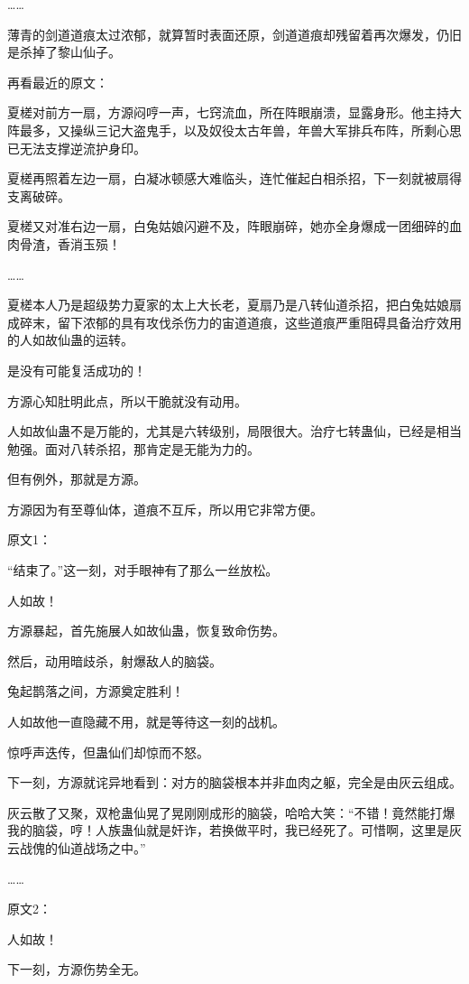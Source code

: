 \begin{this_body}
……

薄青的剑道道痕太过浓郁，就算暂时表面还原，剑道道痕却残留着再次爆发，仍旧是杀掉了黎山仙子。

再看最近的原文：

夏槎对前方一扇，方源闷哼一声，七窍流血，所在阵眼崩溃，显露身形。他主持大阵最多，又操纵三记大盗鬼手，以及奴役太古年兽，年兽大军排兵布阵，所剩心思已无法支撑逆流护身印。

夏槎再照着左边一扇，白凝冰顿感大难临头，连忙催起白相杀招，下一刻就被扇得支离破碎。

夏槎又对准右边一扇，白兔姑娘闪避不及，阵眼崩碎，她亦全身爆成一团细碎的血肉骨渣，香消玉殒！

……

夏槎本人乃是超级势力夏家的太上大长老，夏扇乃是八转仙道杀招，把白兔姑娘扇成碎末，留下浓郁的具有攻伐杀伤力的宙道道痕，这些道痕严重阻碍具备治疗效用的人如故仙蛊的运转。

是没有可能复活成功的！

方源心知肚明此点，所以干脆就没有动用。

人如故仙蛊不是万能的，尤其是六转级别，局限很大。治疗七转蛊仙，已经是相当勉强。面对八转杀招，那肯定是无能为力的。

但有例外，那就是方源。

方源因为有至尊仙体，道痕不互斥，所以用它非常方便。

原文1：

“结束了。”这一刻，对手眼神有了那么一丝放松。

人如故！

方源暴起，首先施展人如故仙蛊，恢复致命伤势。

然后，动用暗歧杀，射爆敌人的脑袋。

兔起鹊落之间，方源奠定胜利！

人如故他一直隐藏不用，就是等待这一刻的战机。

惊呼声迭传，但蛊仙们却惊而不怒。

下一刻，方源就诧异地看到：对方的脑袋根本并非血肉之躯，完全是由灰云组成。

灰云散了又聚，双枪蛊仙晃了晃刚刚成形的脑袋，哈哈大笑：“不错！竟然能打爆我的脑袋，哼！人族蛊仙就是奸诈，若换做平时，我已经死了。可惜啊，这里是灰云战傀的仙道战场之中。”

……

原文2：

人如故！

下一刻，方源伤势全无。


\end{this_body}
